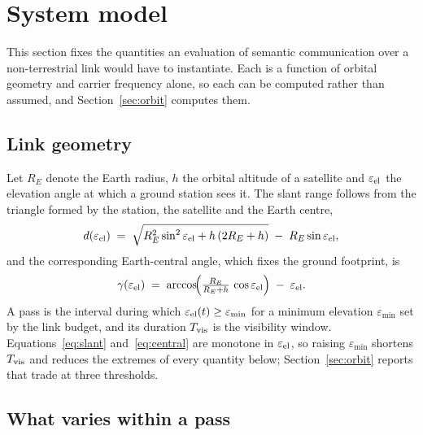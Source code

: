 \documentclass[preprint,11pt,3p]{elsarticle}
\begin{document}
\section{System model}
\label{sec:model}

This section fixes the quantities an evaluation of semantic communication over a non-terrestrial
link would have to instantiate. Each is a function of orbital geometry and carrier frequency
alone, so each can be computed rather than assumed, and Section~\ref{sec:orbit} computes them.

\subsection{Link geometry}

Let $R_E$ denote the Earth radius, $h$ the orbital altitude of a satellite and $\varepsilon_{\rm
el}$ the elevation angle at which a ground station sees it. The slant range follows from the
triangle formed by the station, the satellite and the Earth centre,
\begin{equation}
  d(\varepsilon_{\rm el}) \;=\; \sqrt{R_E^{2}\sin^{2}\varepsilon_{\rm el} + h\,(2R_E + h)}
  \;-\; R_E \sin \varepsilon_{\rm el} ,
  \label{eq:slant}
\end{equation}
and the corresponding Earth-central angle, which fixes the ground footprint, is
\begin{equation}
  \gamma(\varepsilon_{\rm el}) \;=\;
  \arccos\!\Bigl( \tfrac{R_E}{R_E + h}\, \cos \varepsilon_{\rm el} \Bigr)
  \;-\; \varepsilon_{\rm el} .
  \label{eq:central}
\end{equation}
A pass is the interval during which $\varepsilon_{\rm el}(t) \ge \varepsilon_{\min}$ for a
minimum elevation $\varepsilon_{\min}$ set by the link budget, and its duration $T_{\rm vis}$ is
the visibility window. Equations~\eqref{eq:slant} and~\eqref{eq:central} are monotone in
$\varepsilon_{\rm el}$, so raising $\varepsilon_{\min}$ shortens $T_{\rm vis}$ and reduces the
extremes of every quantity below; Section~\ref{sec:orbit} reports that trade at three thresholds.

\subsection{What varies within a pass}
\end{document}
